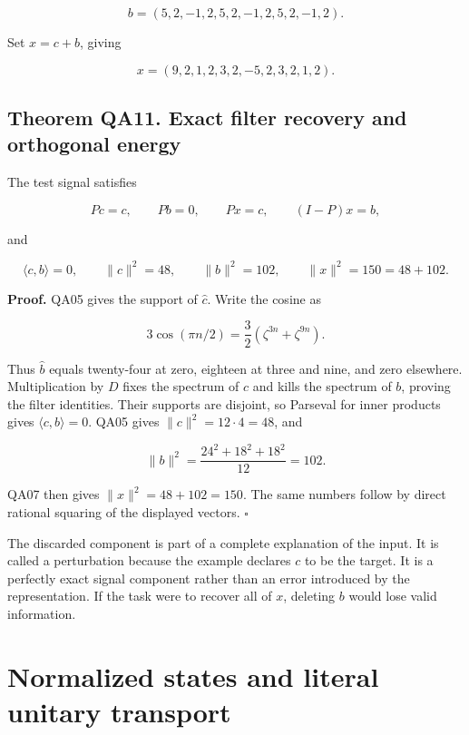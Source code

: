 \[
b=(5,2,-1,2,5,2,-1,2,5,2,-1,2).
\]

Set \(x=c+b\), giving

\[
x=(9,2,1,2,3,2,-5,2,3,2,1,2).
\]

\hypertarget{q:theorem-qa11.-exact-filter-recovery-and-orthogonal-energy}{%
\subsection*{Theorem QA11. Exact filter recovery and orthogonal
energy}\label{q:theorem-qa11.-exact-filter-recovery-and-orthogonal-energy}}

The test signal satisfies

\[
Pc=c,
\qquad Pb=0,
\qquad Px=c,
\qquad (I-P)x=b,
\]

and

\[
\langle c,b\rangle=0,
\qquad \|c\|^2=48,
\qquad \|b\|^2=102,
\qquad \|x\|^2=150=48+102.
\]

\textbf{Proof.} QA05 gives the support of \(\widehat c\). Write the
cosine as

\[
3\cos(\pi n/2)=\frac32(\zeta^{3n}+\zeta^{9n}).
\]

Thus \(\widehat b\) equals twenty-four at zero, eighteen at three and
nine, and zero elsewhere. Multiplication by \(D\) fixes the spectrum of
\(c\) and kills the spectrum of \(b\), proving the filter identities.
Their supports are disjoint, so Parseval for inner products gives
\(\langle c,b\rangle=0\). QA05 gives \(\|c\|^2=12\cdot4=48\), and

\[
\|b\|^2=\frac{24^2+18^2+18^2}{12}=102.
\]

QA07 then gives \(\|x\|^2=48+102=150\). The same numbers follow by
direct rational squaring of the displayed vectors. \(\square\)

The discarded component is part of a complete explanation of the input.
It is called a perturbation because the example declares \(c\) to be the
target. It is a perfectly exact signal component rather than an error
introduced by the representation. If the task were to recover all of
\(x\), deleting \(b\) would lose valid information.

\hypertarget{q:normalized-states-and-literal-unitary-transport}{%
\section{Normalized states and literal unitary
transport}\label{q:normalized-states-and-literal-unitary-transport}}

